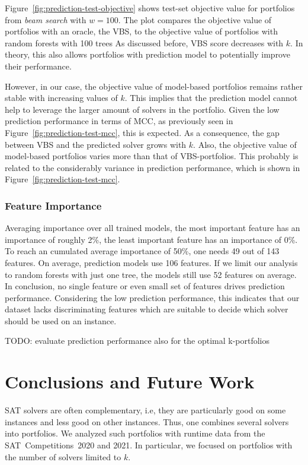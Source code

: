 \documentclass[conference]{IEEEtran}
\newcommand{\todo}[1]{{\color{red}TODO: #1}}
\begin{document}
Figure~\ref{fig:prediction-test-objective} shows test-set objective value for portfolios from \emph{beam search} with $w=100$.
The plot compares the objective value of portfolios with an oracle, the VBS, to the objective value of portfolios with random forests with 100 trees
As discussed before, VBS score decreases with $k$.
In theory, this also allows portfolios with prediction model to potentially improve their performance.

However, in our case, the objective value of model-based portfolios remains rather stable with increasing values of $k$.
This implies that the prediction model cannot help to leverage the larger amount of solvers in the portfolio.
Given the low prediction performance in terms of MCC, as previously seen in Figure~\ref{fig:prediction-test-mcc}, this is expected.
As a consequence, the gap between VBS and the predicted solver grows with $k$.
Also, the objective value of model-based portfolios varies more than that of VBS-portfolios.
This probably is related to the considerably variance in prediction performance, which is shown in Figure~\ref{fig:prediction-test-mcc}.

\subsubsection{Feature Importance}

Averaging importance over all trained models, the most important feature has an importance of roughly 2\%, the least important feature has an importance of 0\%.
To reach an cumulated average importance of 50\%, one needs 49 out of 143 features.
On average, prediction models use 106 features.
If we limit our analysis to random forests with just one tree, the models still use 52 features on average.
In conclusion, no single feature or even small set of features drives prediction performance.
Considering the low prediction performance, this indicates that our dataset lacks discriminating features which are suitable to decide which solver should be used on an instance.

\todo{evaluate prediction performance also for the optimal k-portfolios}

\section{Conclusions and Future Work}
\label{sec:conclusion}

SAT solvers are often complementary, i.e, they are particularly good on some instances and less good on other instances.
Thus, one combines several solvers into portfolios.
We analyzed such portfolios with runtime data from the SAT~Competitions~2020 and 2021.
In particular, we focused on portfolios with the number of solvers limited to $k$.
\end{document}
